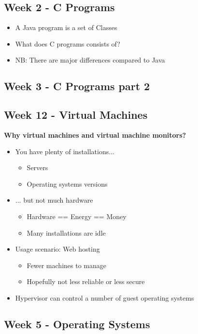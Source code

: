 
\subsection*{Week 2 - C Programs}
\begin{itemize}
\item A Java program is a set of Classes
\item What does C programs consists of?
\item NB: There are major differences compared to Java
\end{itemize}


\subsection*{Week 3 - C Programs part 2}






\subsection*{Week 12 - Virtual Machines}
\textbf{Why virtual machines and virtual machine monitors?}

\begin{itemize}
	\item You have plenty of installations...
	\begin{itemize}
		\item Servers
		\item Operating systems versions
	\end{itemize}

	\item ... but not much hardware
	\begin{itemize}
		\item Hardware == Energy == Money
		\item Many installations are idle
	\end{itemize}
	\item Usage scenario: Web hosting
	\begin{itemize}
		\item Fewer machines to manage
		\item Hopefully not less reliable or less secure
	\end{itemize}
	\item Hypervisor can control a number of guest operating systems
\end{itemize}

\subsection*{Week 5 - Operating Systems}


